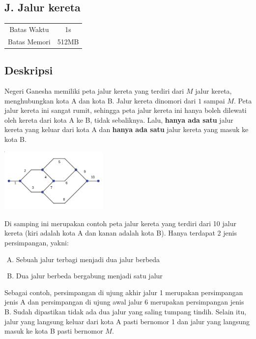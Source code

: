 \documentclass{article}
\begin{document}
\begin{center}
    \section*{J. Jalur kereta}

    \begin{tabular}{ | c c | }
        \hline
        Batas Waktu  & 1s \\
        Batas Memori & 512MB \\
        \hline
    \end{tabular}
\end{center}

\subsection*{Deskripsi}

Negeri Ganesha memiliki peta jalur kereta yang terdiri dari $M$ jalur kereta, menghubungkan kota A dan kota B.
Jalur kereta dinomori dari $1$ sampai $M$.
Peta jalur kereta ini sangat rumit, sehingga peta jalur kereta ini hanya boleh dilewati oleh kereta dari kota A ke B, tidak sebaliknya.
Lalu, \textbf{hanya ada satu} jalur kereta yang keluar dari kota A dan \textbf{hanya ada satu} jalur kereta yang masuk ke kota B.

\begin{multicols}{2}
\begin{center}
    \includegraphics[width=200px]{sample-1}
\end{center}

Di samping ini merupakan contoh peta jalur kereta yang terdiri dari 10 jalur kereta (kiri adalah kota A dan kanan adalah kota B).
Hanya terdapat 2 jenis persimpangan, yakni:
\begin{enumerate}[A.]
    \setlength{\itemsep}{0pt}
    \item Sebuah jalur terbagi menjadi dua jalur berbeda
    \item Dua jalur berbeda bergabung menjadi satu jalur
\end{enumerate}
\end{multicols}

Sebagai contoh, persimpangan di ujung akhir jalur 1 merupakan persimpangan jenis A dan persimpangan di ujung awal jalur 6 merupakan persimpangan jenis B.
Sudah dipastikan tidak ada dua jalur yang saling tumpang tindih.
Selain itu, jalur yang langsung keluar dari kota A pasti bernomor 1 dan jalur yang langsung masuk ke kota B pasti bernomor $M$.
\end{document}
